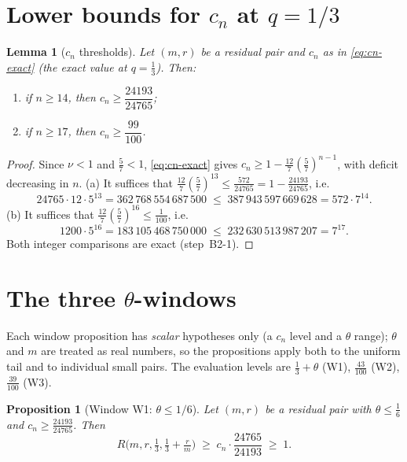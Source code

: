 \documentclass[11pt]{amsart}
\newtheorem{lemma}[theorem]{Lemma}
\newtheorem{proposition}[theorem]{Proposition}
\theoremstyle{remark}
\begin{document}
\section{Lower bounds for $c_n$ at $q=1/3$}\label{sec:cn}

\begin{lemma}[$c_n$ thresholds]\label{lem:cnthr}
Let $(m,r)$ be a residual pair and $c_n$ as in \eqref{eq:cn-exact} (the exact value at $q=\tfrac13$).  Then:
\begin{enumerate}[label=\textup{(\alph*)}]
\item if $n\ge14$, then $c_n\ge\dfrac{24193}{24765}$;
\item if $n\ge17$, then $c_n\ge\dfrac{99}{100}$.
\end{enumerate}
\end{lemma}

\begin{proof}
Since $\nu<1$ and $\tfrac57<1$, \eqref{eq:cn-exact} gives $c_n\ge1-\tfrac{12}7(\tfrac57)^{n-1}$, with deficit decreasing in $n$.
(a) It suffices that $\tfrac{12}7(\tfrac57)^{13}\le\tfrac{572}{24765}=1-\tfrac{24193}{24765}$, i.e.
\[
        24765\cdot12\cdot5^{13}
        =362\,768\,554\,687\,500\;\le\;387\,943\,597\,669\,628
        =572\cdot7^{14}.
\]
(b) It suffices that $\tfrac{12}7(\tfrac57)^{16}\le\tfrac1{100}$, i.e.
\[
        1200\cdot5^{16}=183\,105\,468\,750\,000\;\le\;232\,630\,513\,987\,207=7^{17}.
\]
Both integer comparisons are exact (step~B2-1).
\end{proof}

\section{The three $\theta$-windows}\label{sec:windows}

Each window proposition has \emph{scalar} hypotheses only (a $c_n$ level and a $\theta$ range); $\theta$ and $m$ are treated as real numbers, so the propositions apply both to the uniform tail and to individual small pairs.  The evaluation levels are $\tfrac13+\theta$ (W1), $\tfrac{43}{100}$ (W2), $\tfrac{39}{100}$ (W3).

\begin{proposition}[Window W1: $\theta\le1/6$]\label{prop:W1}
Let $(m,r)$ be a residual pair with $\theta\le\tfrac16$ and $c_n\ge\tfrac{24193}{24765}$.  Then
\[
        R\bigl(m,r,\tfrac13,\tfrac13+\tfrac rm\bigr)\;\ge\;
        c_n\cdot\frac{24765}{24193}\;\ge\;1 .
\]
\end{proposition}
\end{document}
